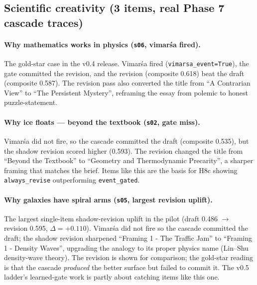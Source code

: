\subsection{Scientific creativity (3 items, real Phase 7 cascade traces)}

\paragraph{Why mathematics works in physics (\texttt{s06}, vimar\'sa fired).} The gold-star case in the v0.4 release. Vimar\'sa fired (\texttt{vimarsa\_event=True}), the gate committed the revision, and the revision (composite 0.618) beat the draft (composite 0.587). The revision pass also converted the title from ``A Contrarian View'' to ``The Persistent Mystery'', reframing the essay from polemic to honest puzzle-statement.

\paragraph{Why ice floats --- beyond the textbook (\texttt{s02}, gate miss).} Vimar\'sa did not fire, so the cascade committed the draft (composite 0.535), but the shadow revision scored higher (0.593). The revision changed the title from ``Beyond the Textbook'' to ``Geometry and Thermodynamic Precarity'', a sharper framing that matches the brief. Items like this are the basis for H8c showing \texttt{always\_revise} outperforming \texttt{event\_gated}.

\paragraph{Why galaxies have spiral arms (\texttt{s05}, largest revision uplift).} The largest single-item shadow-revision uplift in the pilot (draft 0.486 $\to$ revision 0.595, $\Delta=+0.110$). Vimar\'sa did not fire so the cascade committed the draft; the shadow revision sharpened ``Framing 1 - The Traffic Jam'' to ``Framing 1 - Density Waves'', upgrading the analogy to its proper physics name (Lin--Shu density-wave theory). The revision is shown for comparison; the gold-star reading is that the cascade \emph{produced} the better surface but failed to commit it. The v0.5 ladder's learned-gate work is partly about catching items like this one.
